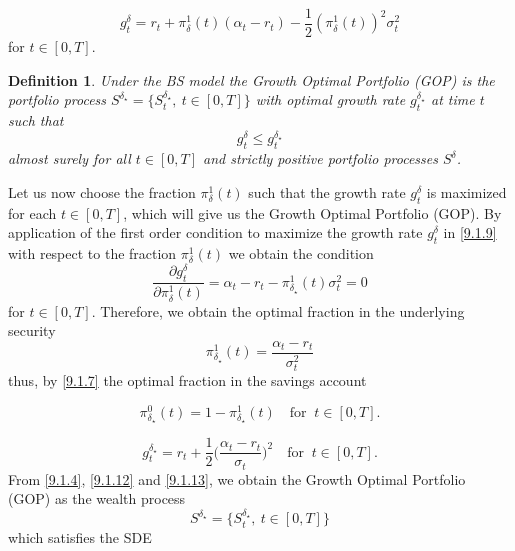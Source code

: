 \documentclass[a4 paper, 12pt]{report}
\theoremstyle{plain}
\newtheorem{definition}[theorem]{\textbf{Definition}}
\begin{document}
\begin{equation}\label{9.1.9}
g_t^\delta = r_t+\pi_\delta^1(t)(\alpha_t-r_t)-\frac{1}{2}(\pi_\delta^1(t))^2\sigma_t^2
\end{equation}
for $t\in[0,T]$.
\begin{definition}\label{9.1.1}
\normalfont
Under the BS model the Growth Optimal Portfolio (GOP) is the portfolio process $S^{\delta_\star} = \{S_t^{\delta_\star},~t\in[0,T]\}$ with optimal growth rate $g_t^{\delta_\star}$ at time $t$ such that
\begin{equation}\label{9.1.10}
g_t^\delta\leq g_t^{\delta_\star}
\end{equation}
almost surely for all $t\in[0,T]$ and strictly positive portfolio processes $S^\delta$.
\end{definition}
\noindent
\par Let us now choose the fraction $\pi_\delta^1(t)$ such that the growth rate $g_t^\delta$ is maximized for each $t\in[0,T]$, which will give us the Growth Optimal Portfolio (GOP). By application of the first order condition to maximize the growth rate $g_t^\delta$ in \eqref{9.1.9} with respect to the fraction $\pi_\delta^1(t)$ we obtain the condition %
\begin{equation}\label{9.1.11}
\frac{\partial g_t^\delta}{\partial\pi_\delta^1(t)} = \alpha_t - r_t - \pi_{\delta_\star}^1(t)\sigma_t^2 = 0
\end{equation}
for $t\in[0,T]$. Therefore, we obtain the optimal fraction in the underlying security
\begin{equation}\label{9.1.12}
\pi_{\delta_\star}^1(t) = \frac{\alpha_t - r_t}{\sigma_t^2}
\end{equation}
thus, by \eqref{9.1.7} the optimal fraction in the savings account

\begin{equation}\label{9.1.13}
\pi_{\delta_\star}^0(t) = 1-\pi_{\delta_\star}^1(t)  ~~~\mbox{  for  }~t\in[0,T].
\end{equation}

\begin{equation}\label{9.1.14}
g_t^{\delta_\star} = r_t+\frac{1}{2}\bigg(\frac{\alpha_t - r_t}{\sigma_t}\bigg)^2~~~\mbox{  for  }~ t\in[0,T].
\end{equation}
From  \eqref{9.1.4}, \eqref{9.1.12} and \eqref{9.1.13}, we obtain the Growth Optimal Portfolio (GOP) as the wealth process
$$
S^{\delta_\star} = \{S_t^{\delta_\star},~t\in[0,T]\}
$$
which satisfies the SDE
\end{document}

